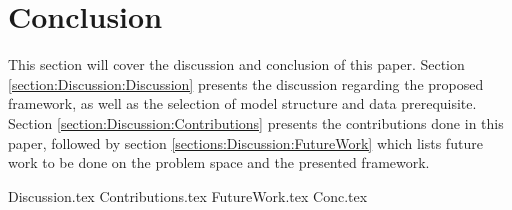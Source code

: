 \chapter{Conclusion}

\label{section:Discussion}

This section will cover the discussion and conclusion of this paper.
Section \ref{section:Discussion:Discussion} presents the discussion regarding the proposed framework,
as well as the selection of model structure and data prerequisite.
Section \ref{section:Discussion:Contributions} presents the contributions done in this paper,
followed by section \ref{sections:Discussion:FutureWork} which lists future work to be done on the problem space and the presented framework.


{Discussion.tex}
{Contributions.tex}
{FutureWork.tex}
{Conc.tex}

